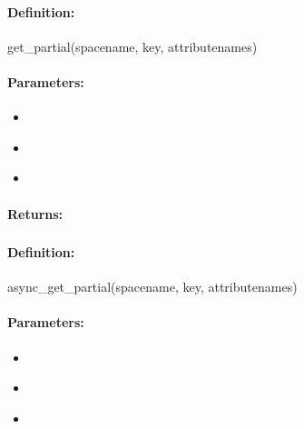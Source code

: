 \paragraph{Definition:}
\begin{rubycode}
get_partial(spacename, key, attributenames)
\end{rubycode}

\paragraph{Parameters:}
\begin{itemize}[noitemsep]
\item {}\\

\item {}\\

\item {}\\

\end{itemize}

\paragraph{Returns:}


\pagebreak
\subsubsection{}
\label{api:ruby:async_get_partial}


\paragraph{Definition:}
\begin{rubycode}
async_get_partial(spacename, key, attributenames)
\end{rubycode}

\paragraph{Parameters:}
\begin{itemize}[noitemsep]
\item {}\\

\item {}\\

\item {}\\

\end{itemize}

